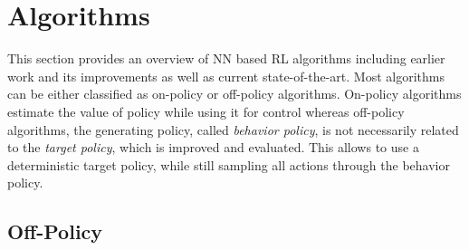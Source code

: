     \section{Algorithms}
	    \label{sec:algo}
	    This section provides an overview of NN based RL algorithms including earlier work and its improvements as well as current state-of-the-art. 
	    Most algorithms can be either classified as on-policy or off-policy algorithms.
		On-policy algorithms estimate the value of policy while using it for control whereas off-policy algorithms, the generating policy, called \textit{behavior policy}, is not necessarily related to the \textit{target policy}, which is improved and evaluated.
		This allows to use a deterministic target policy, while still sampling all actions through the behavior policy. \cite[chapter 5]{Sutton2018}
		
 	\subsection{Off-Policy}
